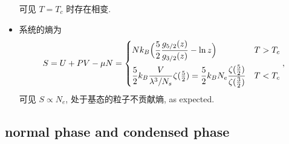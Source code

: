 \begin{itemize}
	可见 $T = T_c$ 时存在相变.
	
	\item 系统的熵为
	\begin{equation} \label{7.1.10}
		S = U + P V - \mu N = \begin{dcases}
			N k_B \Big( \frac{5}{2} \frac{g_{5 / 2}(z)}{g_{3 / 2}(z)} - \ln z \Big) & T > T_c \\
			\frac{5}{2} k_B \frac{V}{\lambda^3 / N_s} \zeta({\textstyle \frac{5}{2}}) = \frac{5}{2} k_B N_e \frac{\zeta(\frac{5}{2})}{\zeta(\frac{3}{2})} & T < T_c
		\end{dcases},
	\end{equation}
	可见 $S \propto N_e$, 处于基态的粒子不贡献熵, as expected.
\end{itemize}

\subsection{normal phase and condensed phase}
